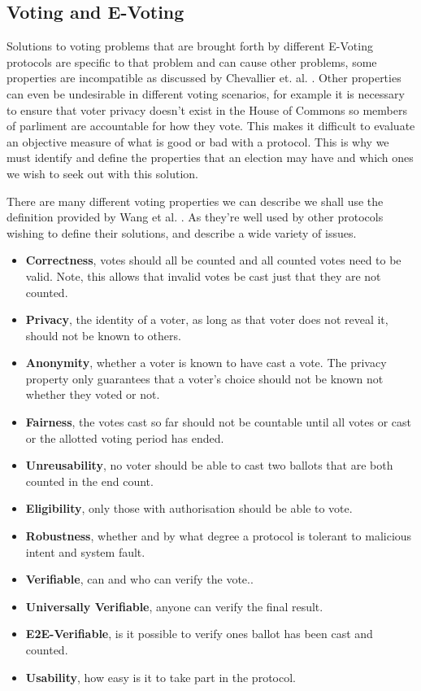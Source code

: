 \documentclass{entcs}
\begin{document}
\subsection{Voting and E-Voting}
Solutions to voting problems that are brought forth by different E-Voting protocols are specific to that problem and can cause other problems, some properties are incompatible as discussed by Chevallier et. al. \cite{Chevallier-mames06onsome}. Other properties can even be undesirable in different voting scenarios, for example it is necessary to ensure that voter privacy doesn't exist in the House of Commons so members of parliment are accountable for how they vote. This makes it difficult to evaluate an objective measure of what is good or bad with a protocol. This is why we must identify and define the properties that an election may have and which ones we wish to seek out with this solution.

There are many different voting properties we can describe we shall use the definition provided by Wang et al. \cite{RequirementOfEVoting}. As they're well used by other protocols wishing to define their solutions, and describe a wide variety of issues.
\begin{itemize}
  \item {\bfseries Correctness}, votes should all be counted and all counted votes need to be valid. Note, this allows that invalid votes be cast just that they are not counted.
  \item {\bfseries Privacy}, the identity of a voter, as long as that voter does not reveal it, should not be known to others.
  \item {\bfseries Anonymity}, whether a voter is known to have cast a vote. The privacy property only guarantees that a voter's choice should not be known not whether they voted or not.
  \item {\bfseries Fairness}, the votes cast so far should not be countable until all votes or cast or the allotted voting period has ended.
  \item {\bfseries Unreusability}, no voter should be able to cast two ballots that are both counted in the end count.
  \item {\bfseries Eligibility}, only those with authorisation should be able to vote.
  \item {\bfseries Robustness}, whether and by what degree a protocol is tolerant to malicious intent and system fault.
  \item {\bfseries Verifiable}, can and who can verify the vote..
  \item {\bfseries Universally Verifiable}, anyone can verify the final result. 
  \item {\bfseries E2E-Verifiable}, is it possible to verify ones ballot has been cast and counted.
  \item {\bfseries Usability}, how easy is it to take part in the protocol.
\end{itemize}
\end{document}
